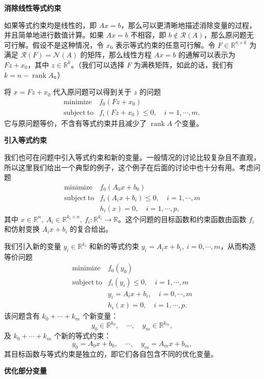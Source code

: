 \documentclass[UTF8, 12pt, fontset=fandol, oneside]{ctexart}
\begin{document}
\noindent\textbf{消除线性等式约束}

如果等式约束均是线性的，即 $Ax=b$，那么可以更清晰地描述消除变量的过程，并且简单地进行数值计算。如果 $Ax=b$ 不相容，即 $b\notin\mathcal{R}(A)$，那么原问题无可行解。假设不是这种情况，令 $x_0$ 表示等式约束的任意可行解。令 $F\in\mathbb{R}^{n\times k}$ 为满足 $\mathcal{R}(F)=\mathcal{N}(A)$ 的矩阵，那么线性方程 $Ax=b$ 的通解可以表示为 $Fz+x_0$，其中 $z\in\mathbb{R}^k$。（我们可以选择 $F$ 为满秩矩阵，如此的话，我们有 $k=n-\operatorname{rank} A$。）

将 $x=Fz+x_0$ 代入原问题可以得到关于 $z$ 的问题
\[
\begin{array}{ll}
\mathop{\mathrm{minimize}} & f_0(Fz+x_0)\\
\mathrm{subject\ to} & f_i(Fz+x_0)\leq 0,\quad i=1,\cdots,m,
\end{array}
\]
它与原问题等价，不含有等式约束并且减少了 $\operatorname{rank}A$ 个变量。

\noindent\textbf{引入等式约束}

我们也可在问题中引入等式约束和新的变量。一般情况的讨论比较复杂且不直观，所以这里我们给出一个典型的例子，这个例子在后面的讨论中也十分有用。考虑问题
\[
\begin{array}{ll}
\mathop{\mathrm{minimize}} & f_0(A_0x+b_0)\\
\mathrm{subject\ to} & f_i(A_ix+b_i)\leq 0,\quad i=1,\cdots,m\\
& h_i(x)=0,\quad i=1,\cdots,p,
\end{array}
\]
其中 $x\in\mathbb{R}^n,\ A_i\in\mathbb{R}^{k_i\times n},\ f_i:\mathbb{R}^{k_i}\to\mathbb{R}$。这个问题的目标函数和约束函数由函数 $f_i$ 和仿射变换 $A_ix+b_i$ 的复合给出。

我们引入新的变量 $y_i\in\mathbb{R}^{k_i}$ 和新的等式约束 $y_i=A_ix+b_i,\ i=0,\cdots,m$，从而构造等价问题
\[
\begin{array}{ll}
\mathop{\mathrm{minimize}} & f_0(y_0)\\
\mathrm{subject\ to} & f_i(y_i)\leq 0,\quad i=1,\cdots,m\\
& y_i=A_ix+b_i,\quad i=0,\cdots,m\\
& h_i(x)=0,\quad i=1,\cdots,p.
\end{array}
\]
该问题含有 $k_0+\cdots+k_m$ 个新变量：
\[
y_0\in\mathbb{R}^{k_0},\quad \cdots,\quad y_m\in\mathbb{R}^{k_m},
\]
及 $k_0+\cdots+k_m$ 个新的等式约束：
\[
y_0=A_0x+b_0,\quad \cdots,\quad y_m=A_mx+b_m,
\]
其目标函数与等式约束是独立的，即它们各自包含不同的优化变量。

\noindent\textbf{优化部分变量}
\end{document}
